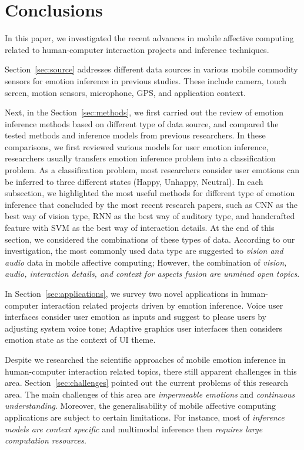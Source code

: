 \section{Conclusions}
\label{sec:conclusion}

In this paper, we investigated the recent advances in mobile affective computing related to human-computer interaction projects and inference techniques.

Section~\ref{sec:source} addresses different data sources in various mobile commodity sensors for emotion inference in previous studies. These include camera, touch screen, motion sensors, microphone, GPS, and application context. 

Next, in the Section~\ref{sec:methods}, 
we first carried out the review of emotion inference methods based on different type of data source, and compared the tested methods and inference models from previous researchers. In these comparisons, we first reviewed various models for user emotion inference, researchers usually transfers emotion inference problem into a classification problem. As a classification problem, most researchers consider user emotions can be inferred to three different states (Happy, Unhappy, Neutral). In each subsection, we highlighted the most useful methods for different type of emotion inference that concluded by the most recent research papers, such as CNN as the best way of vision type, RNN as the best way of auditory type, and handcrafted feature with SVM as the best way of interaction details. At the end of this section, we considered the combinations of these types of data. According to our investigation, the most commonly used data type are suggested to \emph{vision and audio} data in mobile affective computing; However, the combination of \emph{vision, audio, interaction details, and context for aspects fusion are unmined open topics}.

In Section~\ref{sec:applications}, we survey two novel applications in human-computer interaction related projects driven by emotion inference. Voice user interfaces consider user emotion as inputs and suggest to please users by adjusting system voice tone; Adaptive graphics user interfaces then considers emotion state as the context of UI theme.

Despite we researched the scientific approaches of mobile emotion inference in human-computer interaction related topics, there still apparent challenges in this area. Section~\ref{sec:challenges} pointed out the current problems of this research area. The main challenges of this area are \emph{impermeable emotions} and \emph{continuous understanding}. Moreover, the generalisability of mobile affective computing applications are subject to certain limitations. For instance, most of \emph{inference models are context specific} and multimodal inference then \emph{requires large computation resources}.

